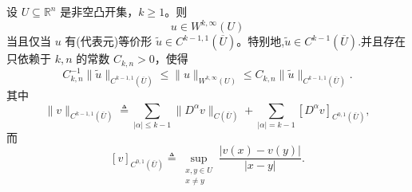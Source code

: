 \documentclass[../../main.tex]{subfiles}
\begin{document}
\begin{corollary}\label{corollary:ch05-Wkinfty代表元}
设 \(U\subseteq\mathbb R^n\) 是非空凸开集，\(k\geqslant1\)。则
\[
u\in W^{k,\infty}(U)
\]
当且仅当 \(u\) 有(代表元)等价形 \(\widetilde u\in C^{k-1,1}(\overline U)\)。特别地,\(\widetilde u\in C^{k-1}(\overline U)\).并且存在只依赖于 \(k,n\) 的常数 \(C_{k,n}>0\)，使得
\[
C_{k,n}^{-1}\|\widetilde u\|_{C^{k-1,1}(\overline U)}
\leqslant
\|u\|_{W^{k,\infty}(U)}
\leqslant
C_{k,n}\|\widetilde u\|_{C^{k-1,1}(\overline U)}.
\]
其中
\[
\|v\|_{C^{k-1,1}(\overline U)}
\triangleq
\sum_{|\alpha|\leqslant k-1}
\|D^\alpha v\|_{C(\overline U)}
+
\sum_{|\alpha|=k-1}
[D^\alpha v]_{C^{0,1}(\overline U)},
\]
而
\[
[v]_{C^{0,1}(\overline U)}
\triangleq
\sup_{\substack{x,y\in U\\x\neq y}}
\frac{|v(x)-v(y)|}{|x-y|}.
\]
\end{corollary}
\end{document}
